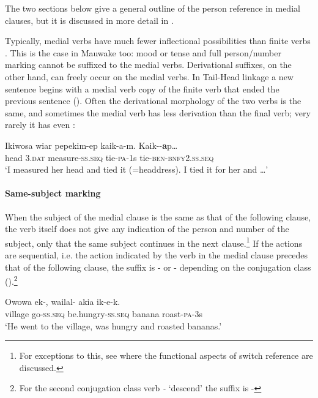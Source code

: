 The two sections below give a general outline of the person reference in medial clauses, but it is discussed in more detail in .

Typically, medial verbs have much fewer inflectional possibilities than finite verbs \citep[11]{Foley1986}. This is the case in Mauwake too: mood or tense and full person/number marking cannot be suffixed to the medial verbs. Derivational suffixes, on the other hand, can freely occur on the medial verbs. In Tail-Head linkage a new sentence begins with a medial verb copy of the finite verb that ended the previous sentence (). Often the derivational morphology of the two verbs is the same, and sometimes the medial verb has less derivation than the final verb; very rarely it has even  :

\ea%
\label{ex:3:x237}
\gll Ikiwosa wiar pepekim-ep kaik-a-m. Kaik--\textbf{a}p{\dots} \\
head 3.\textsc{dat} measure-\textsc{ss}.\textsc{seq} tie-\textsc{pa}-1s tie-\textsc{ben}-\textsc{bnfy}2.\textsc{ss}.\textsc{seq}\\
\glt`I measured her head and tied it (=headdress). I tied it for her and {\dots}'
\z

\paragraph{Same-subject marking}\label{sec:3:a:z:y:x}
{}
When the subject of the medial clause is the same as that of the following clause, the verb itself does not give any indication of the person and number of the subject, only that the same subject continues in the next clause.\footnote{For exceptions to this, see  where the functional aspects of switch reference are discussed.} If the actions are sequential, i.e. the action indicated by the verb in the medial clause precedes that of the following clause, the suffix is \nobreakdash- or \nobreakdash-  depending on the conjugation class ().\footnote{For the second conjugation class verb \textit{-} `descend' the suffix is -} 

\ea%
\label{ex:3:x238}
\gll Owowa ek-, wailal- akia ik-e-k. \\
village go-\textsc{ss}.\textsc{seq} be.hungry-\textsc{ss}.\textsc{seq} banana roast-\textsc{pa}-3s \\
\glt`He went to the village, was hungry and roasted bananas.' 
\z

